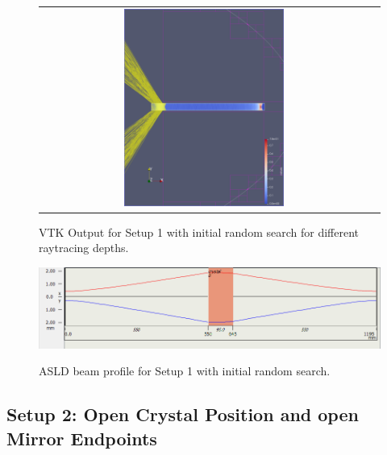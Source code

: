 \documentclass[a4paper,10pt]{article}
\begin{document}
\begin{figure}
\begin{tabular}{c c}
            \includegraphics[width=0.5\textwidth]{images/fixed_rand/4.png} \\
        \end{tabular}
        \label{fig:setup1_rand_depths}
        \caption[VTK Output for Setup 1 with initial random search for 
        different raytracing depths]{
            VTK Output for Setup 1 with initial random search for different 
            raytracing depths.
            }
    \end{figure}

    \begin{figure}
        \includegraphics[width=1.0\textwidth]{images/fixed_rand/beam.png} \\
        \label{fig:setup1_rand_beam}
        \caption[ASLD beam profile for Setup 1 with initial random search]{
            ASLD beam profile for Setup 1 with initial random search.
        }
    \end{figure}
    
    \subsection{Setup 2: Open Crystal Position and open Mirror Endpoints}
   
\end{document}
